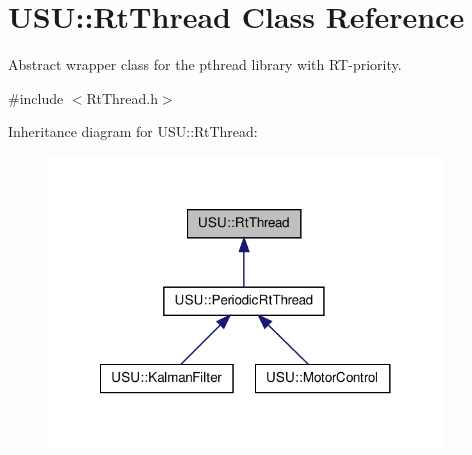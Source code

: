 \hypertarget{class_u_s_u_1_1_rt_thread}{\section{\-U\-S\-U\-:\-:\-Rt\-Thread \-Class \-Reference}
\label{class_u_s_u_1_1_rt_thread}
}


\-Abstract wrapper class for the pthread library with \-R\-T-\/priority.  




{\ttfamily \#include $<$\-Rt\-Thread.\-h$>$}



\-Inheritance diagram for \-U\-S\-U\-:\-:\-Rt\-Thread\-:
\nopagebreak
\begin{figure}[H]
\begin{center}
\leavevmode
\includegraphics[width=296pt]{class_u_s_u_1_1_rt_thread__inherit__graph}
\end{center}
\end{figure}
